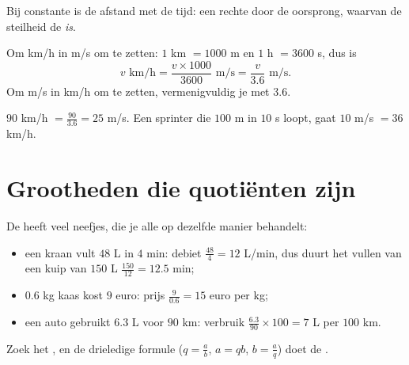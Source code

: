 \begin{omfigure}

{\small Bij constante  is de afstand  met de tijd: een rechte
 door de oorsprong, waarvan de steilheid de  \emph{is}.}
\end{omfigure}

\begin{method}\label{met:g8:speed:convert}
Om km/h in m/s om te zetten: $1$ km $= 1000$ m en $1$ h $= 3600$ s, dus is
\[
v \text{ km/h} = \frac{v \times 1000}{3600} \text{ m/s}
= \frac{v}{3.6} \text{ m/s}.
\]
Om m/s in km/h om te zetten, vermenigvuldig je met $3.6$.
\end{method}

\begin{example}\label{ex:g8:speed:convert}
$90$ km/h $= \frac{90}{3.6} = 25$ m/s. Een sprinter die $100$ m in $10$ s loopt,
gaat $10$ m/s $= 36$ km/h.
\end{example}

\section{Grootheden die quotiënten zijn}

\begin{example}\label{ex:g8:speed:quotients}
De  heeft veel neefjes, die je alle op dezelfde manier behandelt:
\begin{itemize}
  \item een kraan vult $48$ L in $4$ min: debiet $\frac{48}{4} = 12$ L/min, dus
        duurt het vullen van een kuip van $150$ L
        $\frac{150}{12} = 12.5$ min;
  \item $0.6$ kg kaas kost $9$ euro: prijs $\frac{9}{0.6} = 15$ euro per kg;
  \item een auto gebruikt $6.3$ L voor $90$ km: verbruik
        $\frac{6.3}{90} \times 100 = 7$ L per $100$ km.
\end{itemize}
Zoek het , en de drieledige formule ($q = \frac ab$, $a = qb$,
$b = \frac aq$) doet de .
\end{example}

